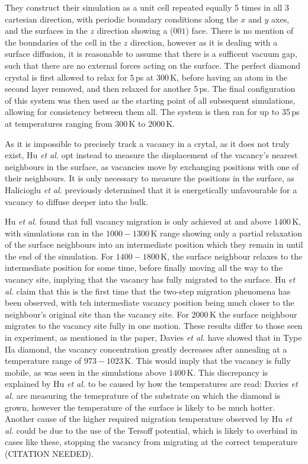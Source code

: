 \documentclass[10pt,a4paper,twocolumn,twoside]{extarticle}
\newcommand{\al}{\emph{et al. }}
\begin{document}
They construct their simulation as a unit cell repeated equally 5 times in all 3 cartesian direction, with periodic boundary conditions along the $x$ and $y$ axes, and the surfaces in the $z$ direction showing a ($001$) face. There is no mention of the boundaries of the cell in the $z$ direction, however as it is dealing with a surface diffusion, it is reasonable to assume that there is a sufficent vacuum gap, such that there are no external forces acting on the surface. The perfect diamond crystal is first allowed to relax for $5$\,ps at $300$\,K, before having an atom in the second layer removed, and then relaxed for another 5\,ps. The final configuration of this system was then used as the starting point of all subsequent simulations, allowing for consistency between them all. The system is then ran for up to 35\,ps at temperatures ranging from $300$\,K to $2000$\,K. 

As it is impossible to precisely track a vacancy in a crytal, as it does not truly exist, Hu \al opt instead to measure the displacement of the vacancy's nearest neighbours in the surface, as vacancies move by exchanging positions with one of their neighbours. It is only necessary to measure the positions in the surface, as Halicioglu \al\cite{Halicioglu} previously determined that it is energetically unfavourable for a vacancy to diffuse deeper into the bulk. 

Hu \al found that full vacancy migration is only achieved at and above $1400$\,K, with simulations ran in the $1000 - 1300$\,K range showing only a partial relaxation of the surface neighbours into an intermediate position which they remain in until the end of the simulation. For $1400 - 1800$\,K, the surface neighbour relaxes to the intermediate position for some time, before finally moving all the way to the vacancy site, implying that the vacancy has fully migrated to the surface. Hu \al claim that this is the first time that the two-step migration phenomena has been observed, with teh intermediate vacancy position being much closer to the neighbour's original site than the vacancy site. For $2000$\,K the surface neighbour migrates to the vacancy site fully in one motion. These results differ to those seen in experiment, as mentioned in the paper, Davies \al\cite{Davies} have showed that in Type IIa diamond, the vacancy concentration greatly decreases after annealing at a temperature range of $973 - 1023$\,K. This would imply that the vacancy is fully mobile, as was seen in the simulations above $1400$\,K. This discrepancy is explained by Hu \al to be caused by how the temperatures are read: Davies \al are measuring the temeprature of the substrate on which the diamond is grown, however the temperature of the surface is likely to be much hotter. Another cause of the higher required migration temperature observed by Hu \al could be due to the use of the Tersoff potential, which is likely to overbind in cases like these, stopping the vacancy from migrating at the correct temperature (CITATION NEEDED).

\printbibliography
\end{document}

